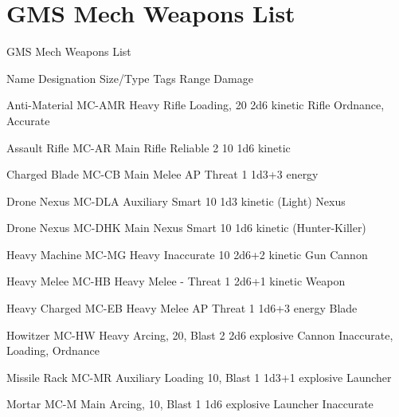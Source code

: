 \section{GMS Mech Weapons List}
                                   GMS Mech Weapons List  

Name                 Designation        Size/Type        Tags                Range          Damage 

Anti-Material        MC-AMR             Heavy Rifle       Loading,            20            2d6 kinetic 
Rifle                                                     Ordnance,  
                                                        Accurate 

Assault Rifle         MC-AR              Main Rifle        Reliable 2          10             1d6 kinetic 

Charged Blade        MC-CB              Main Melee      AP                  Threat 1        1d3+3 energy 

Drone Nexus          MC-DLA             Auxiliary        Smart               10             1d3 kinetic 
(Light)                                 Nexus 

Drone Nexus          MC-DHK             Main Nexus       Smart               10             1d6 kinetic 
(Hunter-Killer) 

Heavy Machine        MC-MG              Heavy            Inaccurate          10            2d6+2 kinetic 
Gun                                     Cannon 

Heavy Melee          MC-HB              Heavy Melee      -                  Threat 1       2d6+1 kinetic 
Weapon 

Heavy Charged        MC-EB              Heavy Melee     AP                  Threat 1        1d6+3 energy 
Blade 

Howitzer             MC-HW              Heavy           Arcing,              20, Blast 2   2d6 explosive 
                                        Cannon           Inaccurate,  
                                                         Loading,  
                                                         Ordnance 

Missile Rack         MC-MR              Auxiliary        Loading             10, Blast 1    1d3+1 explosive 
                                        Launcher 

Mortar               MC-M               Main            Arcing,              10, Blast 1    1d6 explosive 
                                        Launcher         Inaccurate 

